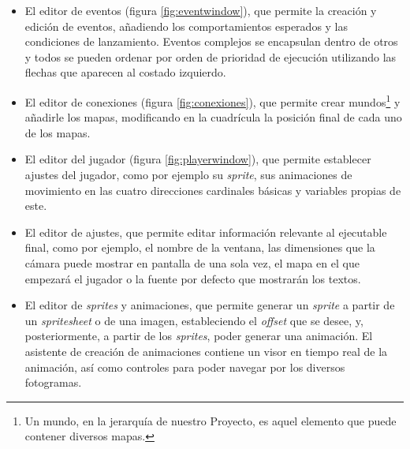 \begin{itemize}
\begin{itemize}
		\item El editor de eventos (figura \ref{fig:eventwindow}), que permite la creación y edición de eventos, añadiendo los comportamientos esperados y las condiciones de lanzamiento. Eventos complejos se encapsulan dentro de otros y todos se pueden ordenar por orden de prioridad de ejecución utilizando las flechas que aparecen al costado izquierdo.
		\item El editor de conexiones (figura \ref{fig:conexiones}), que permite crear mundos\footnote{Un mundo, en la jerarquía de nuestro Proyecto, es aquel elemento que puede contener diversos mapas.} y añadirle los mapas, modificando en la cuadrícula la posición final de cada uno de los mapas.
		\item El editor del jugador (figura \ref{fig:playerwindow}), que permite establecer ajustes del jugador, como por ejemplo su \textit{sprite}, sus animaciones de movimiento en las cuatro direcciones cardinales básicas y variables propias de este.
		\item El editor de ajustes, que permite editar información relevante al ejecutable final, como por ejemplo, el nombre de la ventana, las dimensiones que la cámara puede mostrar en pantalla de una sola vez, el mapa en el que empezará el jugador o la fuente por defecto que mostrarán los textos.
		\item El editor de \textit{sprites} y animaciones, que permite generar un \textit{sprite} a partir de un \textit{spritesheet} o de una imagen, estableciendo el \textit{offset} que se desee, y, posteriormente, a partir de los \textit{sprites}, poder generar una animación. El asistente de creación de animaciones contiene un visor en tiempo real de la animación, así como controles para poder navegar por los diversos fotogramas.
	\end{itemize}
\end{itemize}